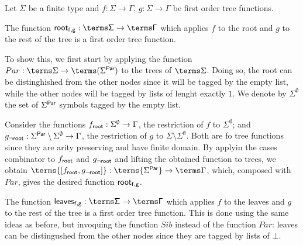\bigskip
\noindent  \begin{example} Let $\Sigma$ be a finite type and $f:\Sigma \to \Gamma$, $g: \Sigma \to \Gamma$ be first order tree functions. 

The function $\sf{root}_{f,g} : \terms\Sigma \to \terms\Gamma$
which applies $f$ to the root and $g$ to the rest of the tree is a first order tree function.
 
To show this, we first start by applying the function $Par:\terms\Sigma\to\terms(\Sigma^{\sf{Par}})$ to the trees of $\terms \Sigma$. Doing so, the root can be distinghished from the other nodes since it will be tagged by the empty list, while the other nodes will be tagged by lists of lenght exactly $1$. We denote by $\Sigma^\emptyset$ the set of $\Sigma^{\sf{Par}}$ symbols tagged by the empty list. 

Consider the functions $f_{\sf{root}}: \Sigma^\emptyset\to \Gamma$, the restriction of $f$ to $\Sigma^\emptyset$; and $g_{\neg\sf{root}}: \Sigma^{\sf{Par}}\setminus\Sigma^\emptyset\to \Gamma$, the restriction of $g$ to $\Sigma\setminus\Sigma^\emptyset$. Both are fo tree functions since they are arity preserving and have finite domain.
By applyin the cases combinator to $f_{\sf{root}}$ and $g_{\neg\sf{root}}$ and lifting the obtained function to trees, we obtain $\terms{[f_{\sf{root}}, g_{\neg\sf{root}}]}: \terms{\Sigma^{\sf{Par}}}\to \terms \Gamma$, which, composed with $Par$, gives the desired function $\sf{root}_{f,g}$.

\medskip
The function $\sf{leaves}_{f,g} : \terms\Sigma \to \terms\Gamma$
 which applies $f$ to the leaves and $g$ to the rest of the tree is a first order tree function. This is done using the same ideas as before, but invoquing the function $Sib$ instead of the function $Par$: leaves can be distingushed from the other nodes since they are tagged by lists of $\bot$. \end{example}

